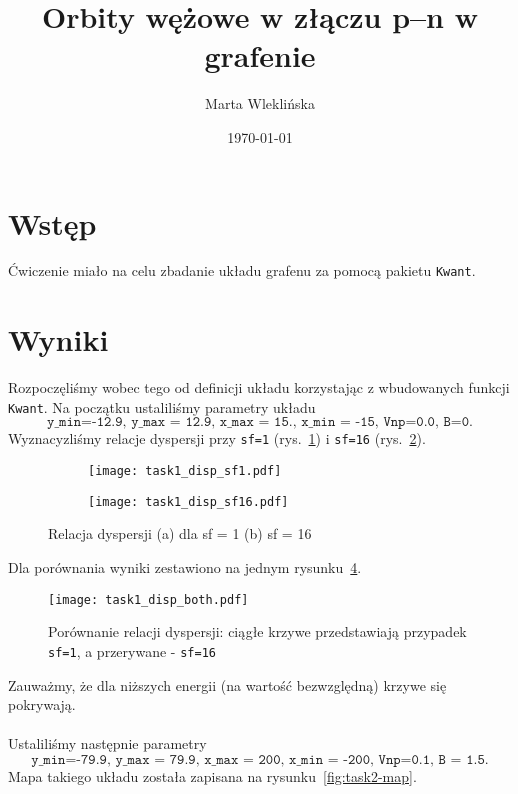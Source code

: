 \documentclass{article}
\title{Orbity wężowe w złączu p--n w grafenie}
\author{Marta Wleklińska}
\date{\today}
\begin{document}
\maketitle
\section{Wstęp}
Ćwiczenie miało na celu zbadanie układu grafenu za pomocą pakietu \texttt{Kwant}.
\section{Wyniki}
Rozpoczęliśmy wobec tego od definicji układu korzystając z wbudowanych funkcji \texttt{Kwant}.
Na początku ustaliliśmy parametry układu
$$\texttt{y\_min=-12.9, y\_max = 12.9, x\_max = 15., x\_min = -15, Vnp=0.0, B=0}.$$
Wyznacyzliśmy relacje dyspersji przy \texttt{sf=1} (rys.~\ref{fig:task1-sf1}) i \texttt{sf=16} (rys.~\ref{fig:task1-sf16}).
\begin{figure}[htp!]
    \centering
\begin{subfigure}{.495\textwidth}
\texttt{[image: task1\_disp\_sf1.pdf]}
    \caption{}
    \label{fig:task1-sf1}
\end{subfigure}
\begin{subfigure}{.495\textwidth}
\texttt{[image: task1\_disp\_sf16.pdf]}
    \caption{}
    \label{fig:task1-sf16}
\end{subfigure}
\caption{Relacja dyspersji (a) dla sf = 1 (b) sf = 16}
\label{fig:task1-sf}
\end{figure}
Dla porównania wyniki zestawiono na jednym rysunku~\ref{fig:task1-both}.
\begin{figure}[htp!]
    \centering
    \texttt{[image: task1\_disp\_both.pdf]}
    \caption{Porównanie relacji dyspersji: ciągłe krzywe przedstawiają przypadek \texttt{sf=1}, a przerywane - \texttt{sf=16}}
    \label{fig:task1-both}
\end{figure}
Zauważmy, że dla niższych energii (na wartość bezwzględną) krzywe się pokrywają.\\
\\
Ustaliliśmy  następnie parametry
$$\texttt{y\_min=-79.9, y\_max = 79.9, x\_max = 200, x\_min = -200, Vnp=0.1, B = 1.5}.$$
Mapa takiego układu została zapisana na rysunku~\ref{fig:task2-map}.
\end{document}
